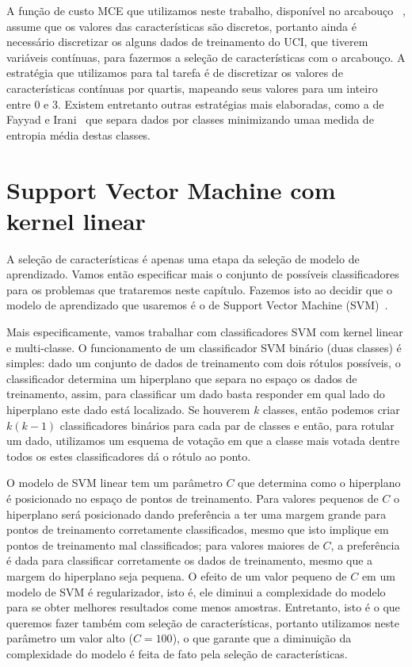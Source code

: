 A função de custo MCE que utilizamos neste trabalho, disponível no
arcabouço ~\cite{Reis+17}, assume que os valores
das características são discretos, portanto ainda é necessário 
discretizar os alguns dados de treinamento do UCI, que tiverem variáveis 
contínuas, para fazermos a seleção de características com o arcabouço.
A estratégia que utilizamos para tal tarefa é de 
discretizar os valores de características contínuas por quartis, 
mapeando seus valores para um inteiro entre 0 e 3. Existem entretanto 
outras estratégias mais elaboradas, como a de Fayyad e Irani~\cite{FI93}
que separa dados por classes minimizando umaa medida de entropia média 
destas classes.

\section{Support Vector Machine com kernel linear}
\label{sec:real_instances:svm}
A seleção de características é apenas uma etapa da seleção de modelo
de aprendizado. Vamos então especificar mais o conjunto de possíveis
classificadores para os problemas que trataremos neste capítulo. Fazemos
isto ao decidir que o modelo de aprendizado que usaremos é o de
Support Vector Machine (SVM)~\cite{CL11}.

Mais especificamente, vamos trabalhar com classificadores SVM com kernel
linear e multi-classe. O funcionamento de um classificador SVM binário
(duas classes) é simples: dado um conjunto de dados de treinamento com 
dois rótulos possíveis, o classificador determina um hiperplano que 
separa no espaço os dados de treinamento, assim, para classificar um 
dado basta responder em qual lado do hiperplano este dado está 
localizado. Se houverem $k$ classes, então podemos criar $k(k-1)$ 
classificadores binários para cada par de classes e então, para rotular 
um dado, utilizamos um esquema de votação em que a classe mais votada 
dentre todos os estes classificadores dá o rótulo ao ponto.

O modelo de SVM linear tem um parâmetro $C$ que determina como o 
hiperplano é posicionado no espaço de pontos de treinamento. Para 
valores pequenos de $C$ o hiperplano será posicionado dando preferência
a ter uma margem grande para pontos de treinamento corretamente 
classificados, mesmo que isto implique em pontos de treinamento mal 
classificados; para valores maiores de $C$, a preferência é dada para 
classificar corretamente os dados de treinamento, mesmo que a margem do
hiperplano seja pequena. O efeito de um valor pequeno de $C$ em um 
modelo de SVM é regularizador, isto é, ele diminui a complexidade do
modelo para se obter melhores resultados come menos amostras. 
Entretanto, isto é o que queremos fazer também com seleção de 
características, portanto utilizamos neste parâmetro um valor alto 
($C = 100$), o que garante que a diminuição da complexidade do modelo é 
feita de fato pela seleção de características.

